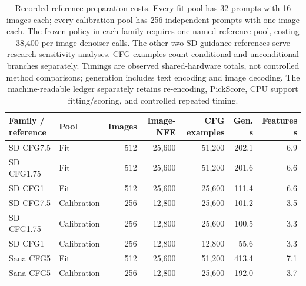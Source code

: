 \begin{table}[t]
\centering\small
\begin{tabular}{llrrrrr}
\toprule
Family / reference & Pool & Images & Image-NFE & CFG examples & Gen. s & Features s \\
\midrule
SD CFG7.5 & Fit & 512 & 25,600 & 51,200 & 202.1 & 6.9 \\
SD CFG1.75 & Fit & 512 & 25,600 & 51,200 & 201.6 & 6.6 \\
SD CFG1 & Fit & 512 & 25,600 & 25,600 & 111.4 & 6.6 \\
SD CFG7.5 & Calibration & 256 & 12,800 & 25,600 & 101.2 & 3.5 \\
SD CFG1.75 & Calibration & 256 & 12,800 & 25,600 & 100.5 & 3.3 \\
SD CFG1 & Calibration & 256 & 12,800 & 12,800 & 55.6 & 3.3 \\
Sana CFG5 & Fit & 512 & 25,600 & 51,200 & 413.4 & 7.1 \\
Sana CFG5 & Calibration & 256 & 12,800 & 25,600 & 192.0 & 3.7 \\
\bottomrule
\end{tabular}
\caption{Recorded reference preparation costs. Every fit pool has 32 prompts with 16 images each; every calibration pool has 256 independent prompts with one image each. The frozen policy in each family requires one named reference pool, costing 38,400 per-image denoiser calls. The other two SD guidance references serve research sensitivity analyses. CFG examples count conditional and unconditional branches separately. Timings are observed shared-hardware totals, not controlled method comparisons; generation includes text encoding and image decoding. The machine-readable ledger separately retains re-encoding, PickScore, CPU support fitting/scoring, and controlled repeated timing.}
\label{tab:t2i_preparation_cost}
\end{table}
